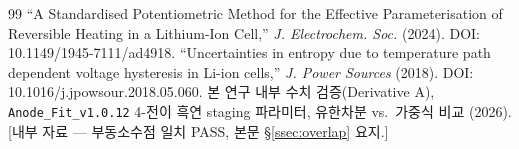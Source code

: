 \documentclass[11pt,a4paper]{article}
\begin{document}
\begin{thebibliography}{99}
 ``A Standardised Potentiometric Method for the Effective Parameterisation of Reversible Heating in a Lithium-Ion Cell,'' \emph{J. Electrochem. Soc.} (2024). DOI: 10.1149/1945-7111/ad4918.
 ``Uncertainties in entropy due to temperature path dependent voltage hysteresis in Li-ion cells,'' \emph{J. Power Sources} (2018). DOI: 10.1016/j.jpowsour.2018.05.060.
 본 연구 내부 수치 검증(Derivative A), \texttt{Anode\_Fit\_v1.0.12} 4-전이 흑연 staging 파라미터, 유한차분 vs.\ 가중식 비교 (2026). [내부 자료 — 부동소수점 일치 PASS, 본문 \S\ref{ssec:overlap} 요지.]
\end{thebibliography}
\end{document}
